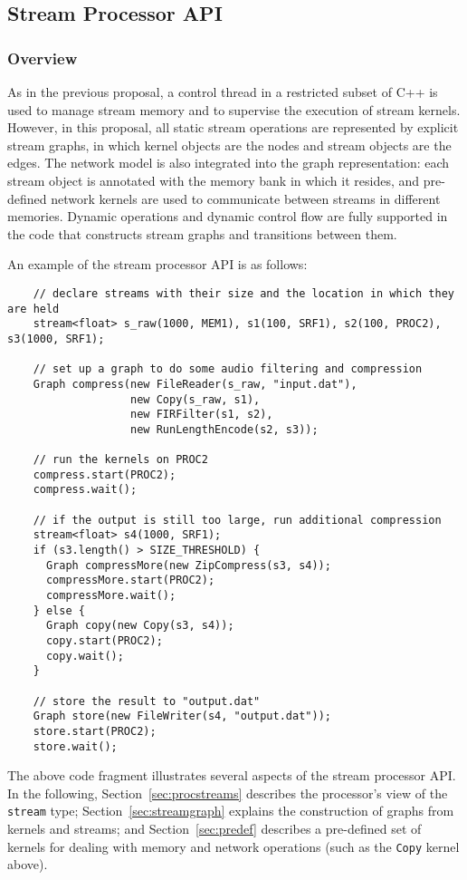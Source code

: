 \subsection{Stream Processor API}

\subsubsection{Overview}
\label{sec:streamover}

As in the previous proposal, a control thread in a restricted subset
of C++ is used to manage stream memory and to supervise the execution
of stream kernels.  However, in this proposal, all static stream
operations are represented by explicit stream graphs, in which kernel
objects are the nodes and stream objects are the edges.  The network
model is also integrated into the graph representation: each stream
object is annotated with the memory bank in which it resides, and
pre-defined network kernels are used to communicate between streams in
different memories.  Dynamic operations and dynamic control flow are
fully supported in the code that constructs stream graphs and
transitions between them.

An example of the stream processor API is as follows:
{\small
\begin{verbatim}
    // declare streams with their size and the location in which they are held
    stream<float> s_raw(1000, MEM1), s1(100, SRF1), s2(100, PROC2), s3(1000, SRF1);

    // set up a graph to do some audio filtering and compression
    Graph compress(new FileReader(s_raw, "input.dat"),
                   new Copy(s_raw, s1),
                   new FIRFilter(s1, s2),
                   new RunLengthEncode(s2, s3));

    // run the kernels on PROC2
    compress.start(PROC2);
    compress.wait();

    // if the output is still too large, run additional compression
    stream<float> s4(1000, SRF1);
    if (s3.length() > SIZE_THRESHOLD) {
      Graph compressMore(new ZipCompress(s3, s4));
      compressMore.start(PROC2);
      compressMore.wait();
    } else {
      Graph copy(new Copy(s3, s4));
      copy.start(PROC2);
      copy.wait();
    }

    // store the result to "output.dat"
    Graph store(new FileWriter(s4, "output.dat"));
    store.start(PROC2);
    store.wait();
\end{verbatim}}

The above code fragment illustrates several aspects of the stream
processor API.  In the following, Section~\ref{sec:procstreams}
describes the processor's view of the {\tt stream} type;
Section~\ref{sec:streamgraph} explains the construction of graphs from
kernels and streams; and Section~\ref{sec:predef} describes a
pre-defined set of kernels for dealing with memory and network
operations (such as the {\tt Copy} kernel above).

